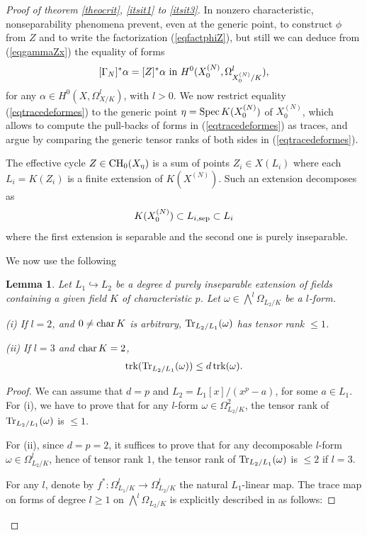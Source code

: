 \documentclass[10pt]{article}
\newtheorem{lemm}[theo]{Lemma}
\begin{document}
\begin{proof}[Proof of theorem \ref{theocrit}, \ref{itsit1} to \ref{itsit3}]
In nonzero characteristic, nonseparability phenomena prevent, even at the generic point, to construct $\phi$ from $Z$  and to write the factorization (\ref{eqfactphiZ}), but still we can deduce from
(\ref{eqgammaZx}) the equality of forms
\begin{eqnarray}\label{eqtracedeformes} [\Gamma_N]^*\alpha=[Z]^*\alpha\,\,{\rm in}\,\, H^0(X^{(N)}_0,\Omega_{X^{(N)}_0/K}^l),
\end{eqnarray}
for any $\alpha\in H^0(X,\Omega_{X/K}^l)$, with $l>0$.
We now restrict equality (\ref{eqtracedeformes}) to the generic point $\eta={\rm Spec}\,K(X_0^{(N)})$ of $X^{(N)}_0$, which allows to compute the pull-backs of forms in (\ref{eqtracedeformes}) as traces, and argue by comparing the generic tensor ranks of both sides in (\ref{eqtracedeformes}).

  The effective cycle $Z\in{\rm CH}_0(X_\eta)$ is a sum of points $Z_i\in X(L_i)$ where each $L_i=K(Z_i)$ is a finite extension of $K(X^{(N)})$. Such an extension decomposes as
$$K(X^{(N)}_0)\subset L_{i,{\rm sep}}\subset L_i$$
where the first extension is separable and the second one is purely inseparable.

We now use the following
\begin{lemm}\label{letraceinsep} Let $ L_1\hookrightarrow L_2$ be a degree $d$ purely inseparable extension of fields containing a given field  $K$ of characteristic $p$.   Let  $\omega \in \bigwedge^l\Omega_{L_2/K}$ be a $l$-form.

(i) If $l=2$, and $0\not={\rm char}\,K$ is arbitrary,  ${\rm Tr}_{L_2/L_1}(\omega)$ has tensor rank $\leq 1$.

(ii) If $l=3$ and ${\rm char}\,K=2$,
\begin{eqnarray}\label{eqdesiredineqtrace}{\rm trk}({\rm Tr}_{L_2/L_1}(\omega))\leq d\,{\rm trk}(\omega).
\end{eqnarray}
\end{lemm}
\begin{proof} We can assume that $d=p$ and  $L_2= L_1[x]/(x^p-a)$, for some $a\in L_1$. For (i), we have  to prove that for any  $l$-form $\omega\in \Omega_{L_{2}/K}^2$, the tensor rank of ${\rm Tr}_{L_2/L_1}(\omega)$ is $\leq 1$.

For (ii), since $d=p=2$,  it suffices to prove that for any  decomposable $l$-form $\omega\in \Omega_{L_{2}/K}^l$, hence of tensor rank $1$, the tensor rank of ${\rm Tr}_{L_2/L_1}(\omega)$  is $\leq 2$ if $l=3$.

For any $l$, denote by $f^*:\Omega_{L_{1}/K}^l\rightarrow \Omega_{L_{2}/K}^l$ the natural $L_1$-linear map. The trace map on forms of degree $l\geq 1$ on $\bigwedge^l\Omega_{L_2/K}$ is explicitly described in \cite[0ADY, Lemma 2.2]{stacks-project}  as follows:


\end{proof}
\end{proof}
\end{document}
